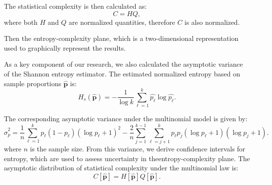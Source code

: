 The statistical complexity is then calculated as:
\begin{equation}
	C=HQ,
\end{equation}
where both $H$ and $Q$ are normalized quantities, therefore $C$ is also normalized.   

Then the entropy-complexity plane, which is a two-dimensional representation used to graphically represent the results. 

As a key component of our research, we also calculated the asymptotic variance of the Shannon entropy estimator. The estimated normalized entropy based on sample proportions $\widehat{\bm{p}}$ is: 
\begin{equation}
	H_s(\widehat{\bm{p}})=-\dfrac{1}{\log k}\sum_{\ell=1}^{k}\widehat{p_\ell}\log\widehat{p_\ell}.
\end{equation}

The corresponding asymptotic variance under the multinomial model is given by:
\begin{equation}
	\widehat{\sigma}^2_p=\dfrac{1}{n}\sum_{\ell=1}^{k}p_\ell(1-p_\ell)(\log p_\ell+1)^2-\dfrac{2}{n}\sum_{j=1}^{k-1}\sum_{\ell=j+1}^{k}p_\ell p_j(\log p_\ell+1)(\log p_j+1).
\end{equation}
where $n$ is the sample size. From this variance, we derive confidence intervals for entropy, which are used to assess uncertainty in theentropy-complexity plane. The asymptotic distribution of statistical complexity under the multinomial law is:
\begin{equation}
		C[\widehat{\bm{p}}]=H[\widehat{\bm{p}}]Q[\widehat{\bm{p}}].
\end{equation}



